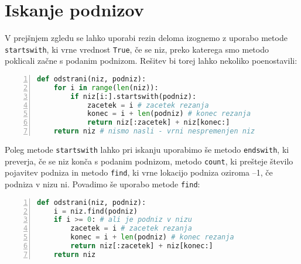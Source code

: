 \section{Iskanje podnizov}
V prejšnjem zgledu se lahko uporabi rezin deloma izognemo z uporabo metode \texttt{startswith}, ki vrne vrednost \texttt{True}, če se niz, preko katerega smo metodo poklicali začne s podanim podnizom. Rešitev bi torej lahko nekoliko poenostavili:
\begin{lstlisting}[language=Python, showstringspaces=false,numbers=left]
def odstrani(niz, podniz):
    for i in range(len(niz)):
        if niz[i:].startswith(podniz):
            zacetek = i # zacetek rezanja
            konec = i + len(podniz) # konec rezanja
            return niz[:zacetek] + niz[konec:]
    return niz # nismo nasli - vrni nespremenjen niz
\end{lstlisting}
Poleg metode \texttt{startswith} lahko pri iskanju uporabimo še metodo \texttt{endswith}, ki preverja, če se niz konča s podanim podnizom, metodo \texttt{count}, ki prešteje število pojavitev podniza in metodo \texttt{find}, ki vrne lokacijo podniza oziroma --1, če podniza v nizu ni. Povadimo še uporabo metode \texttt{find}:
\begin{lstlisting}[language=Python, showstringspaces=false,numbers=left]
def odstrani(niz, podniz):
    i = niz.find(podniz)
    if i >= 0: # ali je podniz v nizu
        zacetek = i # zacetek rezanja
        konec = i + len(podniz) # konec rezanja
        return niz[:zacetek] + niz[konec:]
    return niz
\end{lstlisting}

